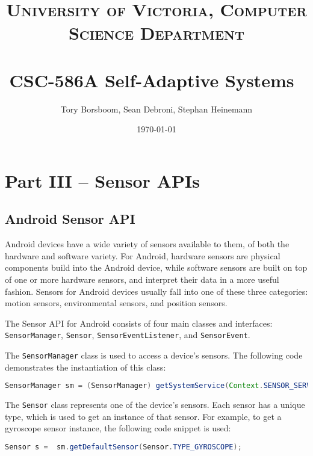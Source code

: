 \documentclass[paper=letter, fontsize=11pt]{scrartcl}
\title{	
\normalfont \normalsize 
\textsc{University of Victoria, Computer Science Department} \\ [25pt]
\horrule{0.5pt} \\[0.4cm]
\huge CSC-586A Self-Adaptive Systems\
\horrule{2pt} \\[0.5cm]
}
\author{Tory Borsboom, Sean Debroni, Stephan Heinemann}
\date{\normalsize\today}
\numberwithin{equation}{section}
\numberwithin{figure}{section}
\numberwithin{table}{section}
\begin{document}
\maketitle 

\small
\clearpage
\section{Part III -- Sensor APIs}
\label{sec:part3}

\subsection{Android Sensor API}
\label{sec:android_sensor_api}
\par
Android devices have a wide variety of sensors available to them, of both the
hardware and software variety. For Android, hardware sensors are physical
components build into the Android device, while software sensors are built on
top of one or more hardware sensors, and interpret their data in a more useful
fashion. Sensors for Android devices usually fall into one of these three
categories: motion sensors, environmental sensors, and position sensors.
\newline

\par
The Sensor \ac{API} for Android consists of four main classes and interfaces:
\texttt{SensorManager}, \texttt{Sensor}, \texttt{SensorEventListener}, and
\texttt{SensorEvent}.
\newline

\par
The \texttt{SensorManager} class is used to access a device's sensors. The
following code demonstrates the instantiation of this class:

\begin{lstlisting}[basicstyle=\small,language=Java]
	SensorManager sm = (SensorManager) getSystemService(Context.SENSOR_SERVICE);
\end{lstlisting}

\par
The \texttt{Sensor} class represents one of the device's sensors. Each sensor
has a unique type, which is used to get an instance of that sensor.
For example, to get a gyroscope sensor instance, the following code snippet
is used:

\begin{lstlisting}[basicstyle=\small,language=Java]
	Sensor s =  sm.getDefaultSensor(Sensor.TYPE_GYROSCOPE);
\end{lstlisting}
\end{document}
